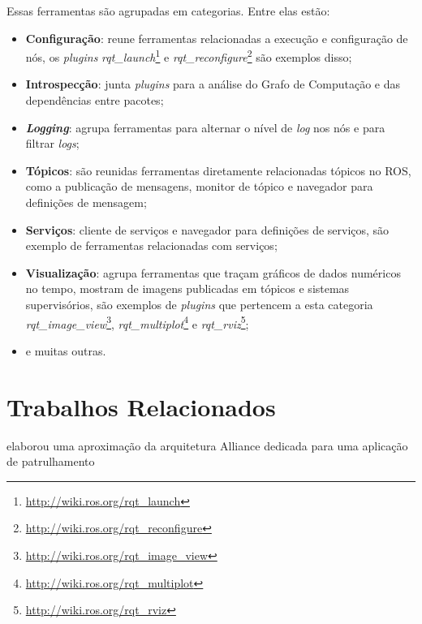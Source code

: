             Essas ferramentas são agrupadas em categorias. Entre elas estão: 
            
            \begin{itemize}
                \item \textbf{Configuração}: reune ferramentas relacionadas a execução e configuração de nós, os \textit{plugins} \textit{rqt\_launch}\footnote{\url{http://wiki.ros.org/rqt_launch}} e \textit{rqt\_reconfigure}\footnote{\url{http://wiki.ros.org/rqt_reconfigure}} são exemplos disso;
                
                \item \textbf{Introspecção}: junta \textit{plugins} para a análise do Grafo de Computação e das dependências entre pacotes;
                
                \item \textbf{\textit{Logging}}: agrupa ferramentas para alternar o nível de \textit{log} nos nós e para filtrar \textit{logs};
                
                \item \textbf{Tópicos}: são reunidas ferramentas diretamente relacionadas tópicos no ROS, como a publicação de mensagens, monitor de tópico e navegador para definições de mensagem;
                
                \item \textbf{Serviços}: cliente de serviços e navegador para definições de serviços, são exemplo de ferramentas relacionadas com serviços;
                
                \item \textbf{Visualização}: agrupa ferramentas que traçam gráficos de dados numéricos no tempo, mostram de imagens publicadas em tópicos e sistemas supervisórios, são exemplos de \textit{plugins} que pertencem a esta categoria \textit{rqt\_image\_view}\footnote{\url{http://wiki.ros.org/rqt_image_view}}, \textit{rqt\_multiplot}\footnote{\url{http://wiki.ros.org/rqt_multiplot}} e \textit{rqt\_rviz}\footnote{\url{http://wiki.ros.org/rqt_rviz}};
                
                \item e muitas outras.
            \end{itemize}
        
    \section{Trabalhos Relacionados} \label{sec:trabalhos_relacionados}
         elaborou uma aproximação da arquitetura Alliance dedicada para uma aplicação de patrulhamento
